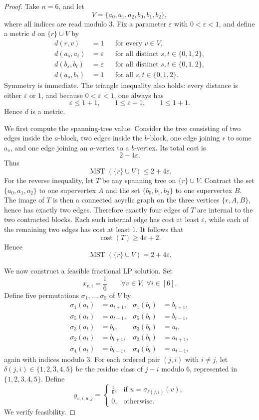 \documentclass[11pt]{article}
\begin{document}
\begin{proof}
Take $n=6$, and let
\[
V=\{a_0,a_1,a_2,b_0,b_1,b_2\},
\]
where all indices are read modulo $3$. Fix a parameter $\varepsilon$ with $0<\varepsilon<1$, and define a metric $d$ on $\{r\}\cup V$ by
\begin{align*}
d(r,v)&=1 && \text{for every } v\in V,\\
d(a_s,a_t)&=\varepsilon && \text{for all distinct } s,t\in\{0,1,2\},\\
d(b_s,b_t)&=\varepsilon && \text{for all distinct } s,t\in\{0,1,2\},\\
d(a_s,b_t)&=1 && \text{for all } s,t\in\{0,1,2\}.
\end{align*}
Symmetry is immediate. The triangle inequality also holds: every distance is either $\varepsilon$ or $1$, and because $0<\varepsilon<1$, one always has
\[
\varepsilon \le 1+1,
\qquad
1 \le \varepsilon+1,
\qquad
1 \le 1+1.
\]
Hence $d$ is a metric.

We first compute the spanning-tree value. Consider the tree consisting of two edges inside the $a$-block, two edges inside the $b$-block, one edge joining $r$ to some $a_s$, and one edge joining an $a$-vertex to a $b$-vertex. Its total cost is
\[
2+4\varepsilon.
\]
Thus
\[
\operatorname{MST}(\{r\}\cup V) \le 2+4\varepsilon.
\]
For the reverse inequality, let $T$ be any spanning tree on $\{r\}\cup V$. Contract the set $\{a_0,a_1,a_2\}$ to one supervertex $A$ and the set $\{b_0,b_1,b_2\}$ to one supervertex $B$. The image of $T$ is then a connected acyclic graph on the three vertices $\{r,A,B\}$, hence has exactly two edges. Therefore exactly four edges of $T$ are internal to the two contracted blocks. Each such internal edge has cost at least $\varepsilon$, while each of the remaining two edges has cost at least $1$. It follows that
\[
\operatorname{cost}(T)\ge 4\varepsilon+2.
\]
Hence
\[
\operatorname{MST}(\{r\}\cup V)=2+4\varepsilon.
\]

We now construct a feasible fractional LP solution. Set
\[
x_{v,i}=\frac16
\qquad \forall v\in V,\ \forall i\in [6].
\]
Define five permutations $\sigma_1,\dots,\sigma_5$ of $V$ by
\begin{align*}
\sigma_1(a_t)&=a_{t+1}, & \sigma_1(b_t)&=b_{t+1},\\
\sigma_5(a_t)&=a_{t-1}, & \sigma_5(b_t)&=b_{t-1},\\
\sigma_3(a_t)&=b_t,     & \sigma_3(b_t)&=a_t,\\
\sigma_2(a_t)&=b_{t+1}, & \sigma_2(b_t)&=a_{t+1},\\
\sigma_4(a_t)&=b_{t-1}, & \sigma_4(b_t)&=a_{t-1},
\end{align*}
again with indices modulo $3$. For each ordered pair $(j,i)$ with $i\neq j$, let $\delta(j,i)\in\{1,2,3,4,5\}$ be the residue class of $j-i$ modulo $6$, represented in $\{1,2,3,4,5\}$. Define
\[
y_{v,i,u,j}=
\begin{cases}
\frac16, & \text{if } u=\sigma_{\delta(j,i)}(v),\\
0, & \text{otherwise.}
\end{cases}
\]
We verify feasibility.


\end{proof}
\end{document}
